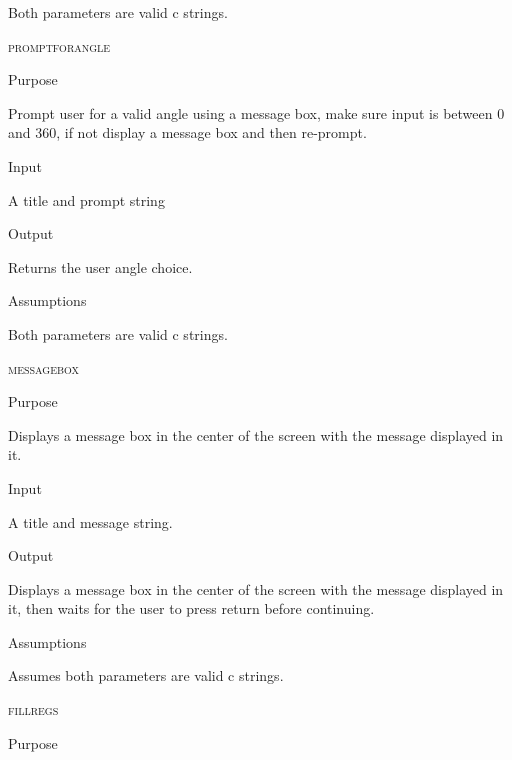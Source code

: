 \documentclass[pdftex, 11pt]{article}
\begin{document}
\begin{description}
\begin{description}
				Both parameters are valid c strings.

		\end{description}


	\item{\textsc{promptforangle}}

		\begin{description}
			\item{Purpose}

				Prompt user for a valid angle using a message box, make sure input is between
				0 and 360, if not display a message box and then re-prompt.

			\item{Input}

				A title and prompt string

			\item{Output}

				Returns the user angle choice.

			\item{Assumptions}

				Both parameters are valid c strings.

		\end{description}


	\item{\textsc{messagebox}}
		\begin{description}
			\item{Purpose}

				Displays a message box in the center of the screen with
				the message displayed in it.

			\item{Input}
				
				A title and message string.

			\item{Output}
				
				Displays a message box in the center of the screen with
				the message displayed in it, then waits for the user to press
				return before continuing.

			\item{Assumptions}

				Assumes both parameters are valid c strings.

		\end{description}



	\item{\textsc{fillregs}}
		\begin{description}
			\item{Purpose}


\end{description}
\end{description}
\end{document}
